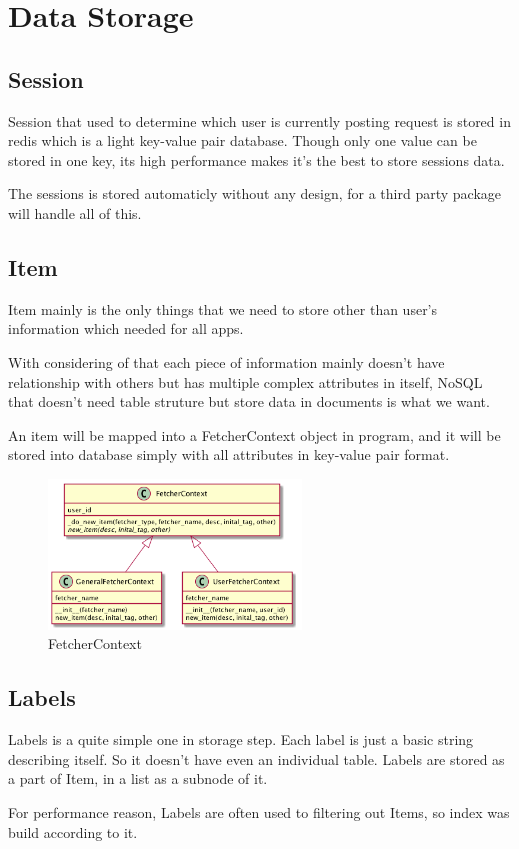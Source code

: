\section{Data Storage}
  \subsection{Session}
    Session that used to determine which user is currently posting request is stored in redis which is a light key-value pair database.
    Though only one value can be stored in one key, its high performance makes it's the best to store sessions data.

    The sessions is stored automaticly without any design, for a third party package will handle all of this.

  \subsection{Item}
    Item mainly is the only things that we need to store other than user's information which needed for all apps.

    With considering of that each piece of information mainly doesn't have relationship with others but has multiple complex attributes in itself,
    NoSQL that doesn't need table struture but store data in documents is what we want.

    An item will be mapped into a FetcherContext object in program, and it will be stored into database simply with all attributes
    in key-value pair format.

    \begin{figure}[H]
      \centering
      \includegraphics[width=0.6\textwidth]{img/fetcherContext.png}
      \caption{FetcherContext\label{fig:fetcherContext}}
    \end{figure}

  \subsection{Labels}
    Labels is a quite simple one in storage step.
    Each label is just a basic string describing itself. So it doesn't have even an individual table.
    Labels are stored as a part of Item, in a list as a subnode of it.

    For performance reason, Labels are often used to filtering out Items, so index was build according to it.

